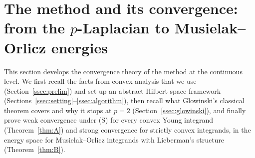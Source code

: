 \documentclass[11pt]{amsart}
\theoremstyle{definition}
\theoremstyle{remark}
\numberwithin{equation}{section}
\begin{document}
\section{The method and its convergence: from the \texorpdfstring{$p$}{p}-Laplacian to Musielak--Orlicz energies}\label{sec:method}

This section develops the convergence theory of the method at the continuous level. We first recall the facts from convex analysis that we use (Section~\ref{ssec:prelim}) and set up an abstract Hilbert space framework (Sections~\ref{ssec:setting}--\ref{ssec:algorithm}), then recall what Glowinski's classical theorem covers and why it stops at $p=2$ (Section~\ref{ssec:glowinski}), and finally prove weak convergence under (S) for every convex Young integrand (Theorem~\ref{thm:A}) and strong convergence for strictly convex integrands, in the energy space for Musielak--Orlicz integrands with Lieberman's structure (Theorem~\ref{thm:B}).
\end{document}
